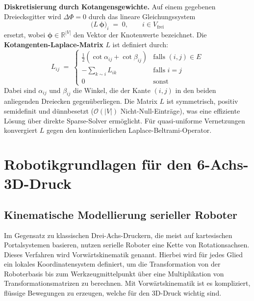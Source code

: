         \textbf{Diskretisierung durch Kotangensgewichte.}
        Auf einem gegebenen Dreiecksgitter wird $\Delta\Phi = 0$ durch das lineare Gleichungssystem
        \begin{equation}
            \bigl(L\,\boldsymbol{\phi}\bigr)_i \;=\; 0, \qquad i \in V_{\mathrm{frei}}
            \label{eq:discrete-laplace}
        \end{equation}
        ersetzt, wobei $\boldsymbol{\phi} \in \mathbb{R}^{|V|}$ den Vektor der Knotenwerte bezeichnet.
        Die \textbf{Kotangenten-Laplace-Matrix} $L$ ist definiert durch:
        \begin{equation}
            L_{ij} \;=\;
            \begin{cases}
                \tfrac{1}{2}\!\left(\cot\alpha_{ij} + \cot\beta_{ij}\right) & \text{falls } (i,j) \in E \\
                -\displaystyle\sum_{k \sim i} L_{ik} & \text{falls } i = j \\
                0 & \text{sonst}
            \end{cases}
            \label{eq:cotangent-laplacian}
        \end{equation}
        Dabei sind $\alpha_{ij}$ und $\beta_{ij}$ die Winkel, die der Kante $(i,j)$
        in den beiden anliegenden Dreiecken gegenüberliegen.
        Die Matrix $L$ ist symmetrisch, positiv semidefinit und dünnbesetzt ($\mathcal{O}(|V|)$ Nicht-Null-Einträge),
        was eine effiziente Lösung über direkte Sparse-Solver ermöglicht.
        Für quasi-uniforme Vernetzungen konvergiert $L$ gegen den kontinuierlichen Laplace-Beltrami-Operator.
        \cite{wardetzkyDiscreteLaplaceOperators2007}

    \section{Robotikgrundlagen für den 6-Achs-3D-Druck}\label{sec:robotics-foundations-for-6-axis-3d-printing}
        \subsection{Kinematische Modellierung serieller Roboter}\label{subsec:kinematic-modeling-of-serial-robots}
        Im Gegensatz zu klassischen Drei-Achs-Druckern, die meist auf kartesischen Portalsystemen basieren, nutzen serielle Roboter eine Kette von Rotationsachsen.
        Dieses Verfahren wird Vorwärtskinematik genannt.
        Hierbei wird für jedes Glied ein lokales Koordinatensystem definiert,
        um die Transformation von der Roboterbasis bis zum Werkzeugmittelpunkt über eine Multiplikation von Transformationsmatrizen zu berechnen.
        Mit Vorwärtskinematik ist es kompliziert, flüssige Bewegungen zu erzeugen, welche für den 3D-Druck wichtig sind.

